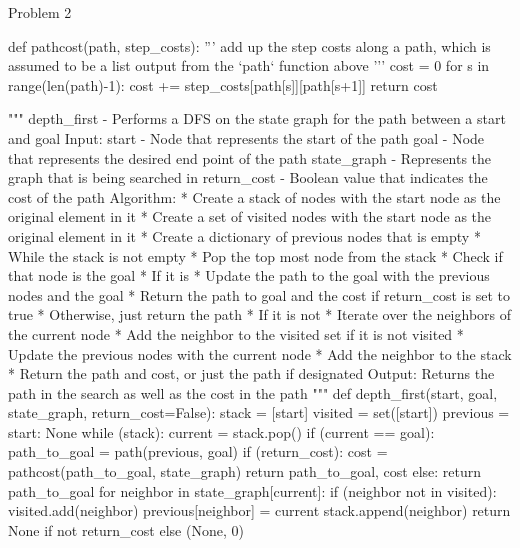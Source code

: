 \begin{problem}{Problem 2}
\begin{highlight}[Solution]
\begin{code}[Python]
    def pathcost(path, step_costs):
        '''
        add up the step costs along a path, which is assumed to be a list output from the `path` function above
        '''
        cost = 0
        for s in range(len(path)-1):
            cost += step_costs[path[s]][path[s+1]]
        return cost
    
    """ depth_first - Performs a DFS on the state graph for the path between a start and goal
        Input:
            start - Node that represents the start of the path
            goal - Node that represents the desired end point of the path
            state_graph - Represents the graph that is being searched in
            return_cost - Boolean value that indicates the cost of the path
        Algorithm:
            * Create a stack of nodes with the start node as the original element in it
            * Create a set of visited nodes with the start node as the original element in it
            * Create a dictionary of previous nodes that is empty
            * While the stack is not empty
                * Pop the top most node from the stack
                * Check if that node is the goal
                * If it is
                    * Update the path to the goal with the previous nodes and the goal
                    * Return the path to goal and the cost if return_cost is set to true
                    * Otherwise, just return the path
                * If it is not
                    * Iterate over the neighbors of the current node
                    * Add the neighbor to the visited set if it is not visited
                    * Update the previous nodes with the current node
                    * Add the neighbor to the stack
            * Return the path and cost, or just the path if designated
        Output:
            Returns the path in the search as well as the cost in the path
    """
    def depth_first(start, goal, state_graph, return_cost=False):
        stack = [start]
        visited = set([start])
        previous = {start: None}
        while (stack):
            current = stack.pop()
            if (current == goal):
                path_to_goal = path(previous, goal)
                if (return_cost):
                    cost = pathcost(path_to_goal, state_graph)
                    return path_to_goal, cost
                else:
                    return path_to_goal
            for neighbor in state_graph[current]:
                if (neighbor not in visited):
                    visited.add(neighbor)
                    previous[neighbor] = current
                    stack.append(neighbor)
        return None if not return_cost else (None, 0)
    \end{code}
    \end{highlight}
\end{problem}

